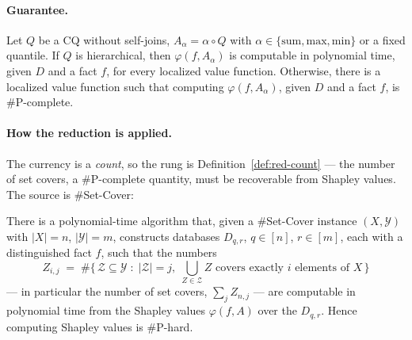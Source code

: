 
\paragraph{Guarantee.}

\begin{theorem}
\label{thm:red-shapley}
Let $Q$ be a CQ without self-joins, $A_\alpha = \alpha \circ Q$ with $\alpha \in
\{\mathrm{sum}, \mathrm{max}, \mathrm{min}\}$ or a fixed quantile. If $Q$ is
hierarchical, then $\varphi(f, A_\alpha)$ is computable in polynomial time, given $D$
and a fact $f$, for every localized value function. Otherwise, there is a localized
value function such that computing $\varphi(f, A_\alpha)$, given $D$ and a fact $f$,
is \#P-complete. \eop
\end{theorem}

\paragraph{How the reduction is applied.}
The currency is a \emph{count}, so the rung is Definition~\ref{def:red-count} --- the
number of set covers, a \#P-complete quantity, must be recoverable from Shapley
values. The source is \#Set-Cover:

\begin{lemma}\label{lem:red-shapley}
There is a polynomial-time algorithm that, given a \#Set-Cover instance $(X,
\mathcal{Y})$ with $|X| = n$, $|\mathcal{Y}| = m$, constructs databases $D_{q,r}$,
$q \in [n]$, $r \in [m]$, each with a distinguished fact $f$, such that the numbers
\[
Z_{i,j} \;=\; \#\bigl\{\, \mathcal{Z} \subseteq \mathcal{Y} \;:\;
|\mathcal{Z}| = j,\; \textstyle\bigcup_{Z \in \mathcal{Z}} Z \text{ covers exactly } i
\text{ elements of } X \,\bigr\}
\]
--- in particular the number of set covers, $\sum_j Z_{n,j}$ --- are computable in
polynomial time from the Shapley values $\varphi(f, A)$ over the $D_{q,r}$. Hence
computing Shapley values is \#P-hard. \eop
\end{lemma}


